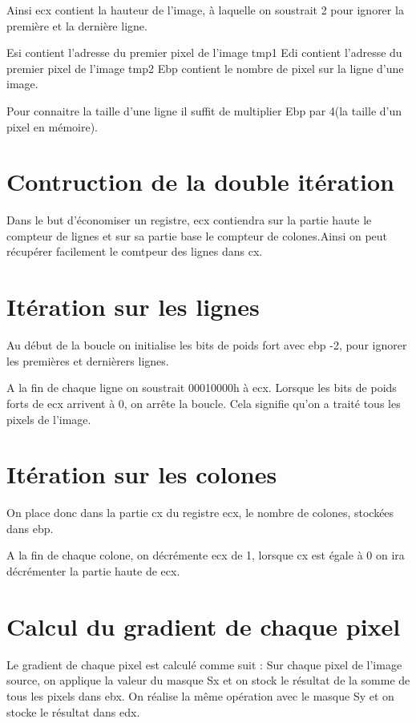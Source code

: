 \documentclass[11pt]{report}
\begin{document}
Ainsi ecx contient la hauteur de l'image, à laquelle on soustrait 2 pour ignorer la première et la dernière ligne.

Esi contient l'adresse du premier pixel de l'image tmp1
Edi contient l'adresse du premier pixel de l'image tmp2
Ebp contient le nombre de pixel sur la ligne d'une image. 

Pour connaitre la taille d'une ligne il suffit de multiplier Ebp par 4(la taille d'un pixel en mémoire).


\section{Contruction de la double itération}

Dans le but d'économiser un registre, ecx contiendra sur la partie haute le compteur de lignes et sur sa partie base le compteur de colones.Ainsi on peut récupérer facilement le comtpeur des lignes dans cx.


\section{Itération sur les lignes}

Au début de la boucle on initialise les bits de poids fort avec ebp -2, pour ignorer les premières et dernièrers lignes. 

A la fin de chaque ligne on soustrait 00010000h à ecx. Lorsque les bits de poids forts de ecx arrivent à 0, on arrête la boucle. Cela signifie qu'on a traité tous les pixels de l'image.

\section{Itération sur les colones}

On place donc dans la partie cx du registre ecx, le nombre de colones, stockées dans ebp.

A la fin de chaque colone, on décrémente ecx de 1, lorsque cx est égale à 0 on ira décrémenter la partie haute de ecx.

\section{Calcul du gradient de chaque pixel}

Le gradient de chaque pixel est calculé comme suit : Sur chaque pixel de l'image source, on applique la valeur du masque Sx et on stock le résultat de la somme de tous les pixels dans ebx. On réalise la même opération avec le masque Sy et on stocke le résultat dans edx. 
\end{document}
